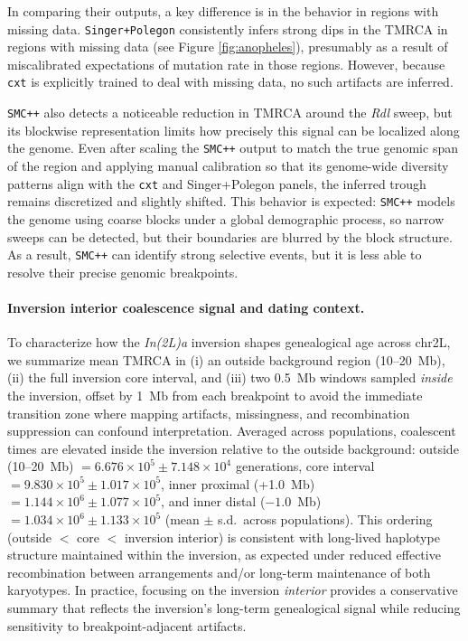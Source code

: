 \documentclass{article}
\newcommand{\cxtkit}{\texttt{cxt}\xspace}
\newcommand{\smcpp}{\texttt{SMC++}\xspace}
\begin{document}
In comparing their outputs, a key difference is in the behavior in regions 
with missing data. \texttt{Singer+Polegon} consistently infers strong dips
in the TMRCA in regions with missing data (see Figure \ref{fig:anopheles}),
presumably as a result of miscalibrated expectations of mutation rate in those regions. 
However, because \cxtkit is explicitly trained to deal with missing data, no such
artifacts are inferred. 


\smcpp also detects a noticeable reduction in TMRCA around the \emph{Rdl} sweep, 
but its blockwise representation limits how precisely this signal can be localized along the genome. 
Even after scaling the \smcpp output to match the true genomic span of the region
and applying manual calibration  so that its genome-wide diversity patterns align with the \cxtkit and Singer+Polegon panels, 
the inferred trough remains discretized and slightly shifted. 
This behavior is expected:
\smcpp models the genome using coarse blocks under a global demographic process,
so narrow sweeps can be detected, but their boundaries are blurred by the block structure. 
As a result, \smcpp can identify strong selective events,
but it is less able to resolve their precise genomic breakpoints.


\paragraph{Inversion interior coalescence signal and dating context.}
To characterize how the \emph{In(2L)a} inversion shapes genealogical age across chr2L, 
we summarize mean TMRCA in 
(i) an outside background region (10--20~Mb), 
(ii) the full inversion core interval, 
and (iii) two 0.5~Mb windows sampled \emph{inside} the inversion, 
offset by 1~Mb from each breakpoint to avoid the immediate transition zone where mapping artifacts,
missingness, 
and recombination suppression can confound interpretation.
Averaged across populations, coalescent times are elevated inside the inversion relative to the outside background:
outside (10--20~Mb) $= 6.676\times 10^{5} \pm 7.148\times 10^{4}$ generations,
core interval $= 9.830\times 10^{5} \pm 1.017\times 10^{5}$,
inner proximal (+1.0~Mb) $= 1.144\times 10^{6} \pm 1.077\times 10^{5}$,
and inner distal ($-1.0$~Mb) $= 1.034\times 10^{6} \pm 1.133\times 10^{5}$ (mean $\pm$ s.d.\ across populations).
This ordering (outside $<$ core $<$ inversion interior) is consistent with long-lived haplotype structure maintained within the inversion, as expected under reduced effective recombination between arrangements and/or long-term maintenance of both karyotypes.
In practice, focusing on the inversion \emph{interior} provides a conservative summary that reflects the inversion’s long-term genealogical signal while reducing sensitivity to breakpoint-adjacent artifacts.
\end{document}
